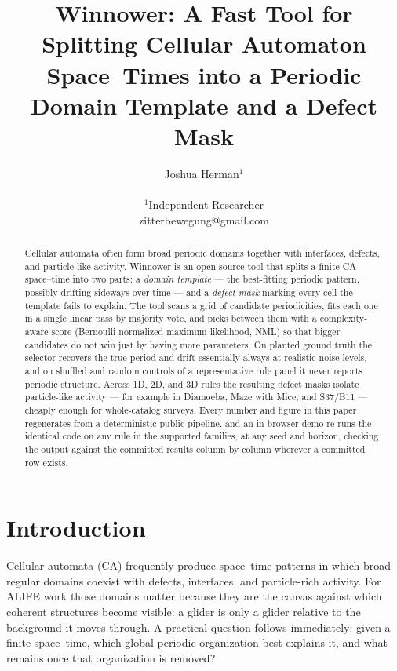 \documentclass[letterpaper]{article}
\title{Winnower: A Fast Tool for Splitting Cellular Automaton
  Space--Times into a Periodic Domain Template and a Defect Mask}
\author{Joshua Herman$^{1}$ \\
\mbox{}\\
$^1$Independent Researcher \\
zitterbewegung@gmail.com}
\begin{document}
\maketitle

\begin{abstract}
Cellular automata often form broad periodic domains together with
interfaces, defects, and particle-like activity. Winnower is an
open-source tool that splits a finite CA space--time into two parts: a
\emph{domain template} --- the best-fitting periodic pattern, possibly
drifting sideways over time --- and a \emph{defect mask} marking every
cell the template fails to explain. The tool scans a grid of candidate
periodicities, fits each one in a single linear pass by majority vote,
and picks between them with a complexity-aware score (Bernoulli
normalized maximum likelihood, NML) so that bigger candidates do not win
just by having more parameters. On planted ground truth the selector
recovers the true period and drift essentially always at realistic noise
levels, and on shuffled and random controls of a representative rule panel it
never reports periodic structure. Across 1D, 2D, and 3D rules the resulting defect masks
isolate particle-like activity --- for example in Diamoeba, Maze with
Mice, and S37/B11 --- cheaply enough for whole-catalog surveys. Every
number and figure in this paper regenerates from a deterministic public
pipeline, and an in-browser demo re-runs the identical code on any rule
in the supported families, at any seed and horizon, checking the output
against the committed results column by column wherever a committed row
exists.
\end{abstract}

\section{Introduction}

Cellular automata (CA) frequently produce space--time patterns in which
broad regular domains coexist with defects, interfaces, and
particle-rich activity. For ALIFE work those domains matter because they
are the canvas against which coherent structures become visible: a
glider is only a glider relative to the background it moves through.
A practical question follows immediately: given a finite space--time,
which global periodic organization best explains it, and what remains
once that organization is removed?
\end{document}
